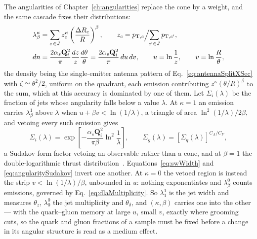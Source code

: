 The angularities of Chapter~\ref{ch:angularities} replace the cone by a weight, and
the same cascade fixes their distributions:
\begin{align}
	\lambda_\beta^\kappa &= \sum_{c\,\in J} z_c^\kappa
	\left(\frac{\Delta R_c}{R}\right)^{\beta} ,
	\qquad
	z_c = p_{\mathrm{T},c}\Big/\!\!\sum_{c^\prime\in J}p_{\mathrm{T},c^\prime} ,
	\notag\\
	dn &= \frac{2\alpha_s\mathbf{Q}_i^2}{\pi}\frac{dz}{z}\frac{d\theta}{\theta}
	= \frac{2\alpha_s\mathbf{Q}_i^2}{\pi}\,du\,dv ,
	\qquad
	u = \ln\frac{1}{z} , \qquad v = \ln\frac{R}{\theta} ,
	\label{eq:angularityDef}
\end{align}
the density being the single-emitter antenna pattern of
Eq.~\ref{eq:antennaSplitXSec} with \(\zeta\simeq\theta^2/2\), uniform on the quadrant,
each emission contributing \(z^\kappa(\theta/R)^\beta\) to the sum, which at this
accuracy is dominated by one of them. Let \(\Sigma_i(\lambda)\) be the fraction of
jets whose angularity falls below a value \(\lambda\). At \(\kappa=1\) an emission
carries \(\lambda^1_\beta\) above \(\lambda\) when \(u+\beta v<\ln(1/\lambda)\), a
triangle of area \(\ln^2(1/\lambda)/2\beta\), and vetoing every such emission gives
\begin{equation}
	\Sigma_i(\lambda) = \exp\left[-\frac{\alpha_s\mathbf{Q}_i^2}{\pi\beta}
	\ln^2\frac{1}{\lambda}\right] ,
	\qquad
	\Sigma_g(\lambda) = \left[\Sigma_q(\lambda)\right]^{C_A/C_F} ,
	\label{eq:angularitySudakov}
\end{equation}
a Sudakov form factor vetoing an observable rather than a cone, and at \(\beta=1\) the
double-logarithmic thrust distribution~\cite{Ellis_Stirling_Webber_1996e}. Equations~\ref{eq:swWidth} and
\ref{eq:angularitySudakov} invert one another. At \(\kappa=0\) the vetoed region is
instead the strip \(v<\ln(1/\lambda)/\beta\), unbounded in \(u\): nothing
exponentiates and \(\lambda^0_\beta\) counts emissions, governed by
Eq.~\ref{eq:dlaMultiplicity}. So \(\lambda^1_1\) is the jet width and measures
\(\theta_z\), \(\lambda^0_0\) the jet multiplicity and \(\theta_\delta\), and
\((\kappa,\beta)\) carries one into the other --- with the quark--gluon memory at
large \(u\), small \(v\), exactly where grooming cuts, so the quark and gluon
fractions of a sample must be fixed before a change in its angular structure is read
as a medium effect.
